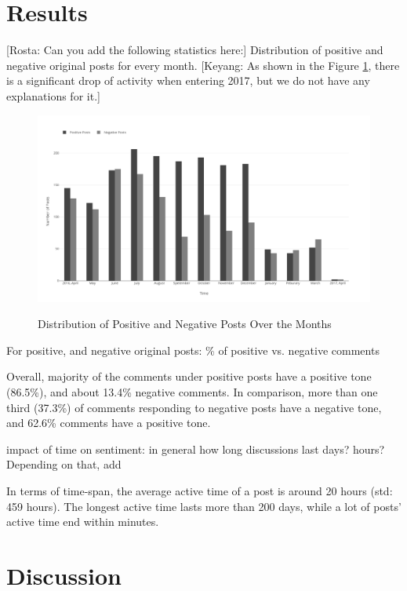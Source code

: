 \documentclass{llncs}
\newcommand{\keyang}[1]{\textcolor{YellowOrange}{[Keyang: #1]}}
\newcommand{\rosta}[1]{\textcolor{BlueGreen}{[Rosta: #1]}}
\begin{document}
\section{Results}

\rosta{Can you add the following statistics here:}
Distribution of positive and negative original posts for every month.
\keyang{As shown in the Figure \ref{fig:monthlydistribution}, there is a significant drop of activity when entering 2017, but we do not have any explanations for it.}
\begin{figure}[ht]
\centering
\includegraphics[width=1\textwidth]{distributionOverMonth}
\label{fig:monthlydistribution}
\caption{Distribution of Positive and Negative Posts Over the Months}
\end{figure}

For positive, and negative original posts: \% of positive  vs. negative comments

Overall, majority of the comments under positive posts have a positive tone (86.5\%), and about 13.4\% negative comments. In comparison, more than one third (37.3\%) of comments responding to negative posts have a negative tone, and 62.6\% comments have a positive tone. 

impact of time on sentiment: in general how long discussions last days? hours? Depending on that, add 

In terms of time-span, the average active time of a post is around 20 hours (std: 459 hours). The longest active time lasts more than 200 days, while a lot of posts' active time end within minutes. 

\section{Discussion}

\printbibliography
\end{document}
